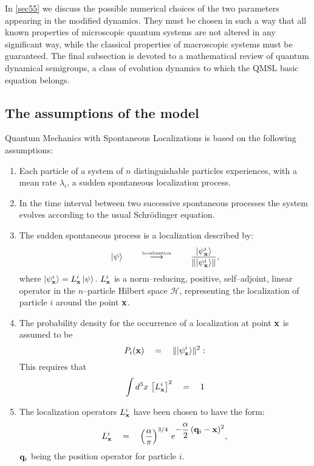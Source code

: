 \documentclass[12pt]{article}
\begin{document}
In \ref{sec55} we discuss the possible numerical choices of the
two parameters appearing in the modified dynamics. They must be
chosen in such a way that all known properties of microscopic
quantum systems are not altered in any significant way, while the
classical properties of macroscopic systems must be guaranteed.
The final subsection is devoted to a mathematical review of
quantum dynamical semigroups, a class of evolution dynamics to
which the QMSL basic equation belongs.


\subsection{The assumptions of the model} \label{sec51}

Quantum Mechanics with Spontaneous Localizations \cite{heid,grw} is
based on the following assumptions:
\begin{enumerate}
\item Each particle of a system of $n$ distinguishable
particles experiences, with a mean rate $\lambda_{i}$, a sudden
spontaneous localization process.
\item In the time interval between two successive spontaneous
processes the system evolves according to the usual Schr\"odinger
equation.
\item The sudden spontaneous process is a localization described by:
\begin{equation} \label{rc}
|\psi\rangle \qquad \stackrel{\makebox{\tiny
localization}}{\longrightarrow} \qquad \frac{|\psi^{i}_{\bf
x}\rangle}{\| |\psi^{i}_{\bf x}\rangle\|},
\end{equation}
where $|\psi^{i}_{\bf x}\rangle = L^{i}_{\bf x}\, |\psi\rangle$.
$L^{i}_{\bf x}$ is a norm--reducing, positive, self--adjoint,
linear operator in the $n$--particle Hilbert space ${\mathcal H}$,
representing the localization of particle $i$ around the point
${\bf x}$.
\item The probability density for the occurrence of a localization
at point ${\bf x}$ is assumed to be
\begin{equation} \label{pd}
P_{i}({\bf x}) \quad = \quad \| |\psi^{i}_{\bf x}\rangle\|^{2}:
\end{equation}
This requires that
\begin{equation}
\int d^{3}x\, \left[ L^{i}_{\bf x}\right]^{2} \quad = \quad 1
\end{equation}
\item The localization operators $L^{i}_{\bf x}$ have been chosen
to have the form:
\begin{equation}
L^{i}_{\bf x} \quad = \quad\left(\frac{\alpha}{\pi}\right)^{3/4}\,
e^{\displaystyle -\frac{\alpha}{2}\, ({\bf q}_{i} - {\bf x})^{2}},
\end{equation}
${\bf q}_{i}$ being the position operator for particle $i$.
\end{enumerate}
\end{document}
